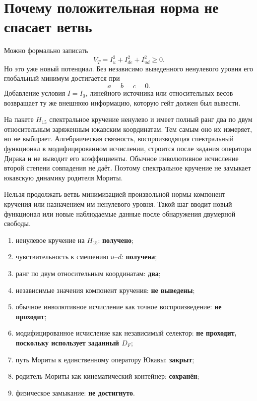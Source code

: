 \section{Почему положительная норма не спасает ветвь}

Можно формально записать
\begin{equation}
 V_T=I_u^2+I_{de}^2+I_{ud}^2\geq0.
\end{equation}
Но это уже новый потенциал. Без независимо выведенного ненулевого уровня
его глобальный минимум достигается при
\begin{equation}
 a=b=c=0.
\end{equation}
Добавление условия $I=I_0$, линейного источника или относительных весов
возвращает ту же внешнюю информацию, которую гейт должен был вывести.

\begin{theorem}
На пакете $H_{15}$ спектральное кручение ненулево и имеет полный ранг два
по двум относительным заряженным юкавским координатам. Тем самым оно их
измеряет, но не выбирает. Алгебраическая связность, воспроизводящая
спектральный функционал в модифицированном исчислении, строится после
задания оператора Дирака и не выводит его коэффициенты. Обычное
инволютивное исчисление второй степени совпадения не даёт. Поэтому
спектральное кручение не замыкает юкавскую динамику родителя Мориты.
\end{theorem}

\begin{nogocriterion}
Нельзя продолжать ветвь минимизацией произвольной нормы компонент кручения
или назначением им ненулевого уровня. Такой шаг вводит новый функционал или
новые наблюдаемые данные после обнаружения двумерной свободы.
\end{nogocriterion}

\begin{protocol}
\begin{enumerate}
 \item ненулевое кручение на $H_{15}$: \textbf{получено};
 \item чувствительность к смешению $u$--$d$: \textbf{получена};
 \item ранг по двум относительным координатам: \textbf{два};
 \item независимые значения компонент кручения:
 \textbf{не выведены};
 \item обычное инволютивное исчисление как точное воспроизведение:
 \textbf{не проходит};
 \item модифицированное исчисление как независимый селектор:
 \textbf{не проходит, поскольку использует заданный $D_F$};
 \item путь Мориты к единственному оператору Юкавы:
 \textbf{закрыт};
 \item родитель Мориты как кинематический контейнер:
 \textbf{сохранён};
 \item физическое замыкание: \textbf{не достигнуто}.
\end{enumerate}
\end{protocol}

